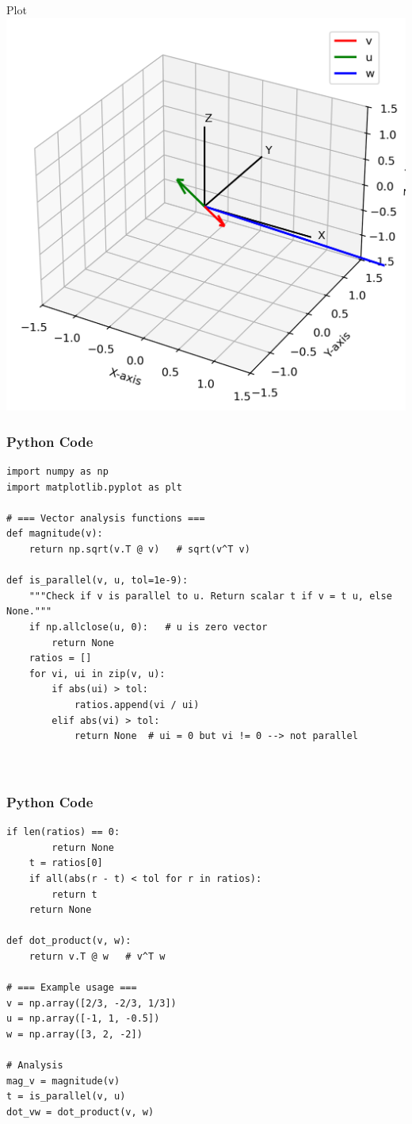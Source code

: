 \documentclass{beamer}
\begin{document}
\begin{frame}{Plot}
    \centering
    \includegraphics[width=\columnwidth, height=0.8\textheight, keepaspectratio]{figs/figure_1.png}     
\end{frame}

\begin{frame}[fragile]
    \frametitle{Python Code}
    \begin{lstlisting}
import numpy as np
import matplotlib.pyplot as plt

# === Vector analysis functions ===
def magnitude(v):
    return np.sqrt(v.T @ v)   # sqrt(v^T v)

def is_parallel(v, u, tol=1e-9):
    """Check if v is parallel to u. Return scalar t if v = t u, else None."""
    if np.allclose(u, 0):   # u is zero vector
        return None
    ratios = []
    for vi, ui in zip(v, u):
        if abs(ui) > tol:
            ratios.append(vi / ui)
        elif abs(vi) > tol:
            return None  # ui = 0 but vi != 0 --> not parallel
    


    \end{lstlisting}
\end{frame}

\begin{frame}[fragile]
    \frametitle{Python Code}
    \begin{lstlisting}
if len(ratios) == 0:
        return None
    t = ratios[0]
    if all(abs(r - t) < tol for r in ratios):
        return t
    return None

def dot_product(v, w):
    return v.T @ w   # v^T w

# === Example usage ===
v = np.array([2/3, -2/3, 1/3])
u = np.array([-1, 1, -0.5])
w = np.array([3, 2, -2])

# Analysis
mag_v = magnitude(v)
t = is_parallel(v, u)
dot_vw = dot_product(v, w)


    \end{lstlisting}
\end{frame}
\end{document}
